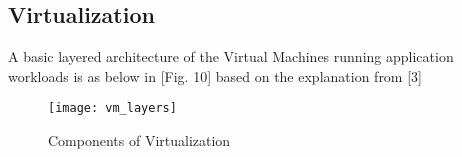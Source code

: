 \subsection{Virtualization}

A basic layered architecture of the Virtual Machines running application workloads is as below in [Fig. 10] based on the explanation from [3]

\begin{figure}
    \centering
    \texttt{[image: vm\_layers]}
    \label{fig:figure9}
    \caption{Components of Virtualization}
\end{figure}
